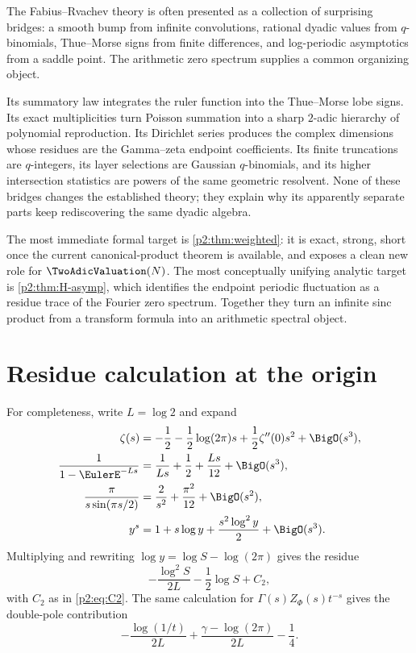 \documentclass[11pt]{article}
\numberwithin{equation}{section}
\theoremstyle{definition}
\theoremstyle{remark}
\begin{document}
The Fabius--Rvachev theory is often presented as a collection of surprising
bridges: a smooth bump from infinite convolutions, rational dyadic values from
$q$-binomials, Thue--Morse signs from finite differences, and log-periodic
asymptotics from a saddle point.  The arithmetic zero spectrum supplies a common
organizing object.

Its summatory law integrates the ruler function into the Thue--Morse lobe signs.
Its exact multiplicities turn Poisson summation into a sharp $2$-adic hierarchy
of polynomial reproduction.  Its Dirichlet series produces the complex
dimensions whose residues are the Gamma--zeta endpoint coefficients.  Its finite
truncations are $q$-integers, its layer selections are Gaussian $q$-binomials,
and its higher intersection statistics are powers of the same geometric
resolvent.  None of these bridges changes the established theory; they explain
why its apparently separate parts keep rediscovering the same dyadic algebra.

The most immediate formal target is \cref{p2:thm:weighted}: it is exact, strong,
short once the current canonical-product theorem is available, and exposes a
clean new role for $\TwoAdicValuation(N)$.  The most conceptually unifying analytic target is
\cref{p2:thm:H-asymp}, which identifies the endpoint periodic fluctuation as a
residue trace of the Fourier zero spectrum.  Together they turn an infinite sinc
product from a transform formula into an arithmetic spectral object.

\appendix
\renewcommand*{\theHsection}{\arabic{part}.\arabic{section}}

\section{Residue calculation at the origin}
\label{p2:app:residue}

For completeness, write $L=\log2$ and expand
\begin{align*}
 \zeta(s)&=-\frac12-\frac12\log(2\pi)s+\frac12\zeta''(0)s^2+\BigO(s^3),\\
 \frac1{1-\EulerE^{-Ls}}&=\frac1{Ls}+\frac12+\frac{Ls}{12}+\BigO(s^3),\\
 \frac{\pi}{s\sin(\pi s/2)}&=\frac2{s^2}+\frac{\pi^2}{12}+\BigO(s^2),\\
 y^s&=1+s\log y+\frac{s^2\log^2y}{2}+\BigO(s^3).
\end{align*}
Multiplying and rewriting $\log y=\log S-\log(2\pi)$ gives the residue
\[
 -\frac{\log^2S}{2L}-\frac12\log S+C_2,
\]
with $C_2$ as in \eqref{p2:eq:C2}.  The same calculation for
$\Gamma(s)Z_\Phi(s)t^{-s}$ gives the double-pole contribution
\[
 -\frac{\log(1/t)}{2L}+\frac{\gamma-\log(2\pi)}{2L}-\frac14.
\]
\end{document}
